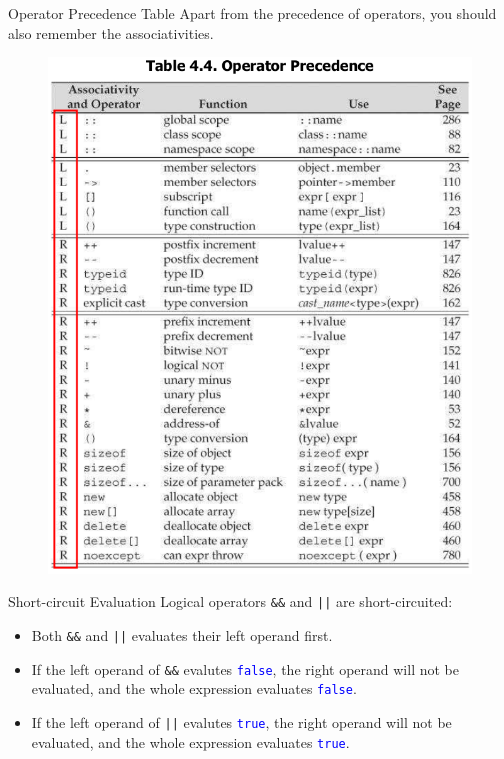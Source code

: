 \documentclass[handout]{beamer}
\newcommand{\blue}[1]{\textcolor{blue}{#1}}
\begin{document}
\begin{frame}{Operator Precedence Table}
    Apart from the precedence of operators, you should also remember the associativities.
    \begin{figure}[h]
        \centering
        \includegraphics[height=0.7\textheight]{figures/precedence.png}
    \end{figure}
\end{frame}

\begin{frame}{Short-circuit Evaluation}
    Logical operators \texttt{\&\&} and \texttt{||} are short-circuited:
    \begin{itemize}
        \item Both \texttt{\&\&} and \texttt{||} evaluates their left operand first.
        \item If the left operand of \texttt{\&\&} evalutes \blue{\texttt{false}}, the right operand will not be evaluated, and the whole expression evaluates \blue{\texttt{false}}.
        \item If the left operand of \texttt{||} evalutes \blue{\texttt{true}}, the right operand will not be evaluated, and the whole expression evaluates \blue{\texttt{true}}.
    \end{itemize}
\end{frame}
\end{document}
